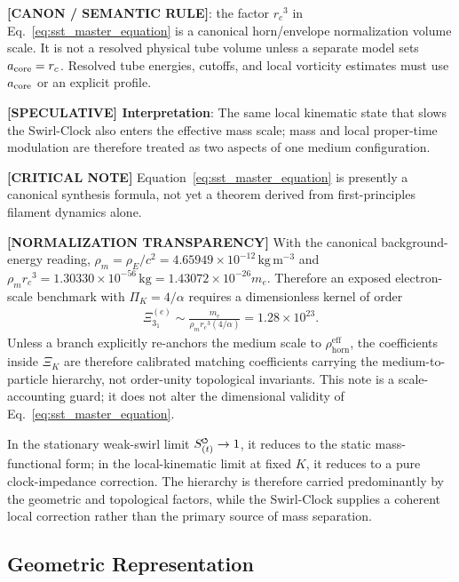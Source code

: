 \documentclass[11pt]{article}
\theoremstyle{definition}
\theoremstyle{plain}
\theoremstyle{remark}
\newcommand{\swirlarrow}{\mathchoice{\mkern-2mu\scriptstyle\boldsymbol{\circlearrowleft}}{\mkern-2mu\scriptstyle\boldsymbol{\circlearrowleft}}{\mkern-2mu\scriptscriptstyle\boldsymbol{\circlearrowleft}}{\mkern-2mu\scriptscriptstyle\boldsymbol{\circlearrowleft}}}
\newcommand{\rhoE}{\rho_{\!E}}
\newcommand{\rhoM}{\rho_{\!m}}
\newcommand{\rhohorn}{\rho_{\mathrm{horn}}^{\mathrm{eff}}}
\newcommand{\SwirlClock}{{S_{(t)}^{\swirlarrow}}}
\newcommand{\rc}{{r_c}}
\begin{document}
        \textbf{[CANON / SEMANTIC RULE]}: the factor \(\rc^3\) in Eq.~\eqref{eq:sst_master_equation} is a canonical horn/envelope normalization volume scale. It is not a resolved physical tube volume unless a separate model sets \(a_{\rm core}=\rc\). Resolved tube energies, cutoffs, and local vorticity estimates must use \(a_{\rm core}\) or an explicit profile.

        \textbf{[SPECULATIVE] Interpretation}: The same local kinematic state that slows the Swirl-Clock also enters the effective mass scale; mass and local proper-time modulation are therefore treated as two aspects of one medium configuration.

        \textbf{[CRITICAL NOTE]} Equation~\eqref{eq:sst_master_equation} is presently a canonical synthesis formula, not yet a theorem derived from first-principles filament dynamics alone.

        \textbf{[NORMALIZATION TRANSPARENCY]} With the canonical background-energy reading, $\rhoM=\rhoE/c^2=4.65949\times10^{-12}\,\mathrm{kg\,m^{-3}}$ and $\rhoM\rc^3=1.30330\times10^{-56}\,\mathrm{kg}=1.43072\times10^{-26}m_e$. Therefore an exposed electron-scale benchmark with $\Pi_K=4/\alpha$ requires a dimensionless kernel of order
        \begin{align}
            \Xi_{3_1}^{(e)}
            \sim
            \frac{m_e}{\rhoM\rc^3(4/\alpha)}
            =
            1.28\times10^{23}.
            \label{eq:kernel_normalization_scale_guard}
        \end{align}
        Unless a branch explicitly re-anchors the medium scale to $\rhohorn$, the coefficients inside $\Xi_K$ are therefore calibrated matching coefficients carrying the medium-to-particle hierarchy, not order-unity topological invariants. This note is a scale-accounting guard; it does not alter the dimensional validity of Eq.~\eqref{eq:sst_master_equation}.

        In the stationary weak-swirl limit $\SwirlClock \to 1$, it reduces to the static mass-functional form; in the local-kinematic limit at fixed $K$, it reduces to a pure clock-impedance correction. The hierarchy is therefore carried predominantly by the geometric and topological factors, while the Swirl-Clock supplies a coherent local correction rather than the primary source of mass separation.

    \subsection{Geometric Representation}
        
\end{document}
